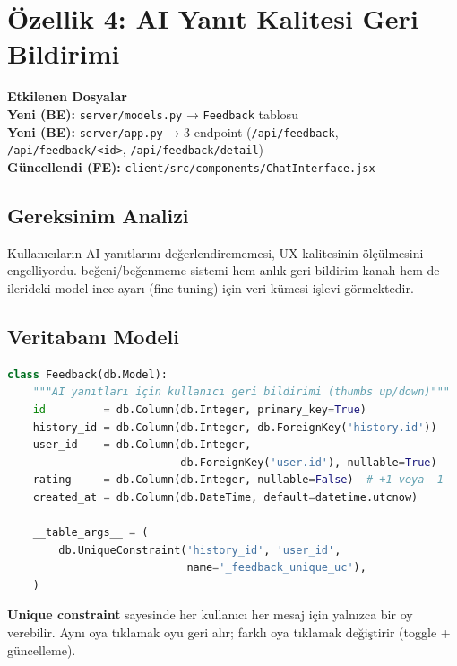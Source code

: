 \documentclass[12pt,a4paper]{article}
\newenvironment{featurebox}[1]{%
  \begin{mdframed}[
    backgroundcolor=bgweek,
    linecolor=borderpurple,
    linewidth=0.8pt,
    innerleftmargin=8pt,
    innerrightmargin=8pt,
    innertopmargin=6pt,
    innerbottommargin=6pt,
    roundcorner=4pt
  ]
  \raggedright
  \noindent\textbf{\small #1}\\[4pt]
}{%
  \end{mdframed}
}
\begin{document}
\newpage

\section{Özellik 4: AI Yanıt Kalitesi Geri Bildirimi}

\begin{featurebox}{Etkilenen Dosyalar}
\textbf{Yeni (BE):} \texttt{server/models.py} → \texttt{Feedback} tablosu\\
\textbf{Yeni (BE):} \texttt{server/app.py} → 3 endpoint (\texttt{/api/feedback}, \texttt{/api/feedback/<id>}, \texttt{/api/feedback/detail})\\
\textbf{Güncellendi (FE):} \texttt{client/src/components/ChatInterface.jsx}
\end{featurebox}

\subsection{Gereksinim Analizi}
Kullanıcıların AI yanıtlarını değerlendirememesi, UX kalitesinin ölçülmesini engelliyordu. beğeni/beğenmeme sistemi hem anlık geri bildirim kanalı hem de ilerideki model ince ayarı (fine-tuning) için veri kümesi işlevi görmektedir.

\subsection{Veritabanı Modeli}

\begin{lstlisting}[language=Python, caption={models.py — Feedback tablosu}]
class Feedback(db.Model):
    """AI yanıtları için kullanıcı geri bildirimi (thumbs up/down)"""
    id         = db.Column(db.Integer, primary_key=True)
    history_id = db.Column(db.Integer, db.ForeignKey('history.id'))
    user_id    = db.Column(db.Integer,
                           db.ForeignKey('user.id'), nullable=True)
    rating     = db.Column(db.Integer, nullable=False)  # +1 veya -1
    created_at = db.Column(db.DateTime, default=datetime.utcnow)

    __table_args__ = (
        db.UniqueConstraint('history_id', 'user_id',
                            name='_feedback_unique_uc'),
    )
\end{lstlisting}

\textbf{Unique constraint} sayesinde her kullanıcı her mesaj için yalnızca bir oy verebilir. Aynı oya tıklamak oyu geri alır; farklı oya tıklamak değiştirir (toggle + güncelleme).
\end{document}
